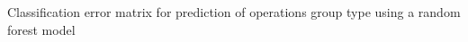 Classification error matrix for prediction of operations group type using a random forest model
\label{fig:operations_classification}